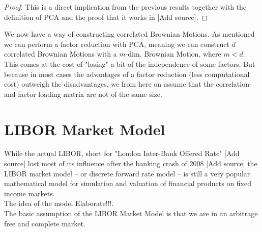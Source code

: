 \documentclass[12pt]{article}
\begin{document}
	\begin{proof}
		This is a direct implication from the previous results together with the definition of PCA and the proof that it works in \color{red}[Add source]\color{black}. %
	\end{proof}
	We now have a way of constructing correlated Brownian Motions. As mentioned we can perform a factor reduction with PCA, meaning we can construct $d$ correlated Brownian Motions with a $m$-dim. Brownian Motion, where $m < d$. This comes at the cost of "losing" a bit of the independence of some factors. But because in most cases the advantages of a factor reduction (less computational cost) outweigh the disadvantages, we from here on assume that the correlation- and factor loading matrix are not of the same size.
	
	
	
	
	\pagebreak
	\section{LIBOR Market Model}\label{sec::LIBORModel}
	
	While the actual LIBOR, short for "London Inter-Bank Offered Rate" \color{red}[Add source] \color{black} %
	lost most of its influence after the banking crash of 2008 \color{red}[Add source] \color{black} %
	the LIBOR market model -- or discrete forward rate model -- is still a very popular mathematical model for simulation and valuation of financial products on fixed income markets.\\
	The idea of the model  \color{red}Elaborate!!!\color{black}. 
	\\
	The basic assumption of the LIBOR Market Model is that we are in an arbitrage free and complete market.
	
\end{document}
